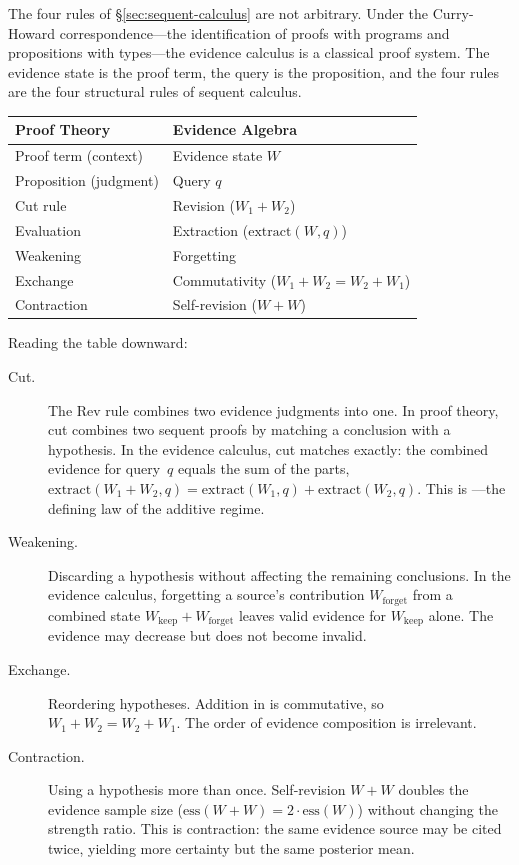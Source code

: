\documentclass[11pt,openany]{report}
\begin{document}
The four rules of \S\ref{sec:sequent-calculus} are not arbitrary.
Under the Curry-Howard correspondence---the identification of proofs
with programs and propositions with types---the evidence calculus is a
classical proof system.  The evidence state is the proof term, the
query is the proposition, and the four rules are the four structural
rules of sequent calculus.

\medskip
\begin{center}
\begin{tabular}{ll}
\toprule
\textbf{Proof Theory}   & \textbf{Evidence Algebra} \\
\midrule
Proof term (context)     & Evidence state $W$ \\
Proposition (judgment)   & Query $q$ \\
Cut rule                 & Revision ($W_1 + W_2$) \\
Evaluation               & Extraction ($\mathrm{extract}(W, q)$) \\
Weakening                & Forgetting \\
Exchange                 & Commutativity ($W_1 + W_2 = W_2 + W_1$) \\
Contraction              & Self-revision ($W + W$) \\
\bottomrule
\end{tabular}
\end{center}
\medskip

\noindent
Reading the table downward:

\begin{description}
\item[Cut.]  The Rev rule combines two evidence judgments into one.
  In proof theory, cut combines two sequent proofs by matching a
  conclusion with a hypothesis.  In the evidence calculus, cut
  matches exactly: the combined evidence for query~$q$ equals the
  sum of the parts, $\mathrm{extract}(W_1 + W_2, q) =
  \mathrm{extract}(W_1, q) + \mathrm{extract}(W_2, q)$.  This is
  ---the defining law of the additive regime.

\item[Weakening.]  Discarding a hypothesis without affecting the
  remaining conclusions.  In the evidence calculus, forgetting a
  source's contribution $W_{\mathrm{forget}}$ from a combined state
  $W_{\mathrm{keep}} + W_{\mathrm{forget}}$ leaves valid evidence
  for $W_{\mathrm{keep}}$ alone.  The evidence may decrease but does
  not become invalid.

\item[Exchange.]  Reordering hypotheses.  Addition in
   is commutative, so
  $W_1 + W_2 = W_2 + W_1$.  The order of evidence composition
  is irrelevant.

\item[Contraction.]  Using a hypothesis more than once.
  Self-revision $W + W$ doubles the evidence sample size
  ($\mathrm{ess}(W + W) = 2 \cdot \mathrm{ess}(W)$) without
  changing the strength ratio.  This is contraction: the same
  evidence source may be cited twice, yielding more certainty
  but the same posterior mean.
\end{description}
\end{document}
